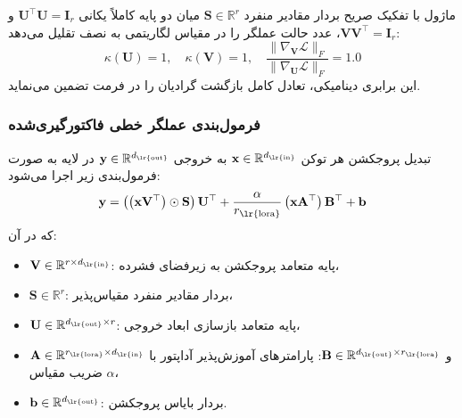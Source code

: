 ماژول  با تفکیک صریح بردار مقادیر منفرد $\mathbf{S} \in \mathbb{R}^r$ میان دو پایه کاملاً یکانی $\mathbf{U}^\top \mathbf{U} = \mathbf{I}_r$ و $\mathbf{V}\mathbf{V}^\top = \mathbf{I}_r$، عدد حالت عملگر را در مقیاس لگاریتمی به نصف تقلیل می‌دهد:
\begin{equation}
\kappa(\mathbf{U}) = 1, \quad \kappa(\mathbf{V}) = 1, \quad \frac{\|\nabla_{\mathbf{V}} \mathcal{L}\|_F}{\|\nabla_{\mathbf{U}} \mathcal{L}\|_F} = 1.0
\end{equation}
این برابری دینامیکی، تعادل کامل بازگشت گرادیان را در فرمت  تضمین می‌نماید.

\subsubsection*{فرمول‌بندی عملگر خطی فاکتورگیری‌شده }
تبدیل پروجکشن هر توکن $\mathbf{x} \in \mathbb{R}^{d_{\text{\lr{in}}}}$ به خروجی $\mathbf{y} \in \mathbb{R}^{d_{\text{\lr{out}}}}$ در لایه  به صورت فرمول‌بندی زیر اجرا می‌شود:
\begin{equation}
\mathbf{y} = \left( \left( \mathbf{x} \mathbf{V}^\top \right) \odot \mathbf{S} \right) \mathbf{U}^\top + \frac{\alpha}{r_{\text{\lr{lora}}}} \left( \mathbf{x} \mathbf{A}^\top \right) \mathbf{B}^\top + \mathbf{b}
\end{equation}
که در آن:
\begin{itemize}
    \item $\mathbf{V} \in \mathbb{R}^{r \times d_{\text{\lr{in}}}}$: پایه متعامد پروجکشن به زیرفضای فشرده،
    \item $\mathbf{S} \in \mathbb{R}^r$: بردار مقادیر منفرد مقیاس‌پذیر،
    \item $\mathbf{U} \in \mathbb{R}^{d_{\text{\lr{out}}} \times r}$: پایه متعامد بازسازی ابعاد خروجی،
    \item $\mathbf{A} \in \mathbb{R}^{r_{\text{\lr{lora}}} \times d_{\text{\lr{in}}}}$ و $\mathbf{B} \in \mathbb{R}^{d_{\text{\lr{out}}} \times r_{\text{\lr{lora}}}}$: پارامترهای آموزش‌پذیر آداپتور  با ضریب مقیاس $\alpha$،
    \item $\mathbf{b} \in \mathbb{R}^{d_{\text{\lr{out}}}}$: بردار بایاس پروجکشن.
\end{itemize}

